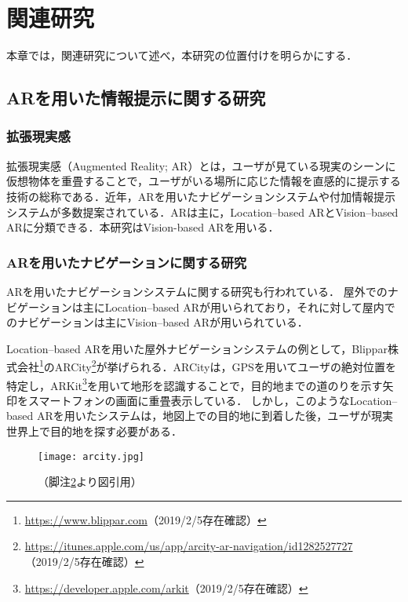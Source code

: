 \chapter{関連研究}
\label{chapter:relatedwork}
本章では，関連研究について述べ，本研究の位置付けを明らかにする．

\section{ARを用いた情報提示に関する研究}
  \subsection{拡張現実感}
    拡張現実感（Augmented Reality; AR）とは，ユーザが見ている現実のシーンに仮想物体を重畳することで，ユーザがいる場所に応じた情報を直感的に提示する技術の総称である\cite{Kambara:2010}．近年，ARを用いたナビゲーションシステムや付加情報提示システムが多数提案されている．ARは主に，Location--based ARとVision--based ARに分類できる\cite{Chatzopoulos:2017}．本研究はVision-based ARを用いる．

  \subsection{ARを用いたナビゲーションに関する研究}
    ARを用いたナビゲーションシステムに関する研究も行われている．
    屋外でのナビゲーションは主にLocation--based ARが用いられており，それに対して屋内でのナビゲーションは主にVision--based ARが用いられている．

    Location--based ARを用いた屋外ナビゲーションシステムの例として，Blippar株式会社\footnote{\url{https://www.blippar.com}（2019/2/5存在確認）}のARCity\footnote{\url{https://itunes.apple.com/us/app/arcity-ar-navigation/id1282527727}\label{footnote:arcity}（2019/2/5存在確認）}が挙げられる．ARCityは，GPSを用いてユーザの絶対位置を特定し，ARKit\footnote{\url{https://developer.apple.com/arkit}（2019/2/5存在確認）}を用いて地形を認識することで，目的地までの道のりを示す矢印をスマートフォンの画面に重畳表示している．
    しかし，このようなLocation--based ARを用いたシステムは，地図上での目的地に到着した後，ユーザが現実世界上で目的地を探す必要がある．
    \begin{figure}[tb]
      \centerline{\texttt{[image: arcity.jpg]}}
      \caption{（脚注\ref{footnote:arcity}より図引用）}
      \label{figure:koch}
    \end{figure}

